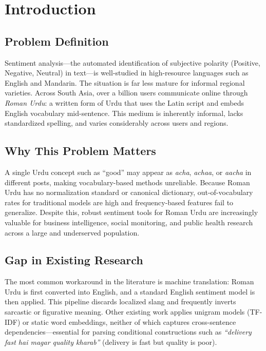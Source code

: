 \documentclass[conference]{IEEEtran}
\begin{document}
\section{Introduction}

\subsection{Problem Definition}
Sentiment analysis---the automated identification of subjective polarity (Positive, Negative, Neutral) in text---is well-studied in high-resource languages such as English and Mandarin. The situation is far less mature for informal regional varieties. Across South Asia, over a billion users communicate online through \textit{Roman Urdu}: a written form of Urdu that uses the Latin script and embeds English vocabulary mid-sentence. This medium is inherently informal, lacks standardized spelling, and varies considerably across users and regions.

\subsection{Why This Problem Matters}
A single Urdu concept such as ``good'' may appear as \textit{acha}, \textit{achaa}, or \textit{aacha} in different posts, making vocabulary-based methods unreliable. Because Roman Urdu has no normalization standard or canonical dictionary, out-of-vocabulary rates for traditional models are high and frequency-based features fail to generalize. Despite this, robust sentiment tools for Roman Urdu are increasingly valuable for business intelligence, social monitoring, and public health research across a large and underserved population.

\subsection{Gap in Existing Research}
The most common workaround in the literature is machine translation: Roman Urdu is first converted into English, and a standard English sentiment model is then applied. This pipeline discards localized slang and frequently inverts sarcastic or figurative meaning. Other existing work applies unigram models (TF-IDF) or static word embeddings, neither of which captures cross-sentence dependencies---essential for parsing conditional constructions such as \textit{``delivery fast hai magar quality kharab''} (delivery is fast but quality is poor).
\end{document}
